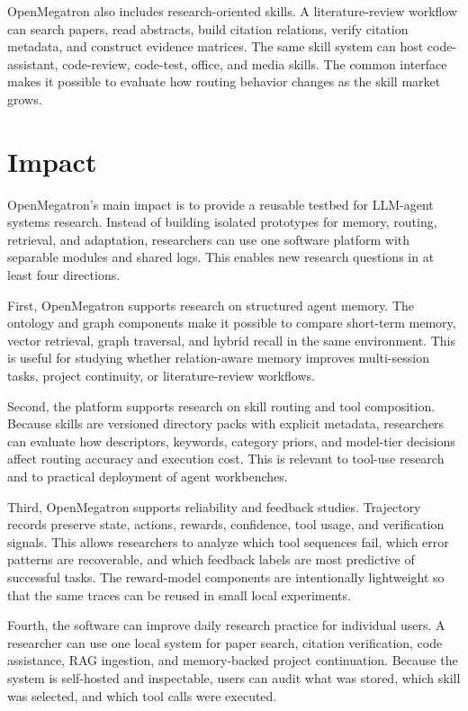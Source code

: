 \documentclass[preprint,12pt,a4paper]{elsarticle}
\begin{document}
OpenMegatron also includes research-oriented skills. A literature-review workflow can search papers, read abstracts, build citation relations, verify citation metadata, and construct evidence matrices. The same skill system can host code-assistant, code-review, code-test, office, and media skills. The common interface makes it possible to evaluate how routing behavior changes as the skill market grows.

\section{Impact}

OpenMegatron's main impact is to provide a reusable testbed for LLM-agent systems research. Instead of building isolated prototypes for memory, routing, retrieval, and adaptation, researchers can use one software platform with separable modules and shared logs. This enables new research questions in at least four directions.

First, OpenMegatron supports research on structured agent memory. The ontology and graph components make it possible to compare short-term memory, vector retrieval, graph traversal, and hybrid recall in the same environment. This is useful for studying whether relation-aware memory improves multi-session tasks, project continuity, or literature-review workflows.

Second, the platform supports research on skill routing and tool composition. Because skills are versioned directory packs with explicit metadata, researchers can evaluate how descriptors, keywords, category priors, and model-tier decisions affect routing accuracy and execution cost. This is relevant to tool-use research and to practical deployment of agent workbenches.

Third, OpenMegatron supports reliability and feedback studies. Trajectory records preserve state, actions, rewards, confidence, tool usage, and verification signals. This allows researchers to analyze which tool sequences fail, which error patterns are recoverable, and which feedback labels are most predictive of successful tasks. The reward-model components are intentionally lightweight so that the same traces can be reused in small local experiments.

Fourth, the software can improve daily research practice for individual users. A researcher can use one local system for paper search, citation verification, code assistance, RAG ingestion, and memory-backed project continuation. Because the system is self-hosted and inspectable, users can audit what was stored, which skill was selected, and which tool calls were executed.
\end{document}
